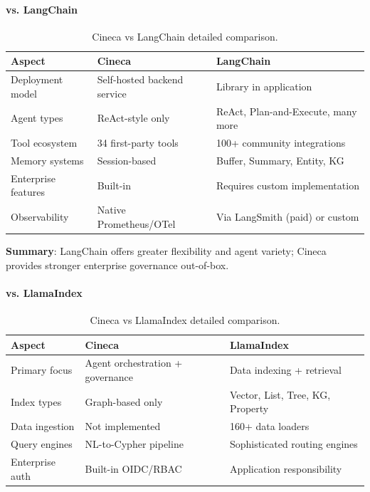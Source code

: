 \paragraph{vs. LangChain}

\begin{table}[ht]
\centering
\caption{Cineca vs LangChain detailed comparison.}
\label{tab:vs-langchain}
\small
\begin{tabular}{lll}
\hline
\textbf{Aspect} & \textbf{Cineca} & \textbf{LangChain} \\
\hline
Deployment model & Self-hosted backend service & Library in application \\
Agent types & ReAct-style only & ReAct, Plan-and-Execute, many more \\
Tool ecosystem & 34 first-party tools & 100+ community integrations \\
Memory systems & Session-based & Buffer, Summary, Entity, KG \\
Enterprise features & Built-in & Requires custom implementation \\
Observability & Native Prometheus/OTel & Via LangSmith (paid) or custom \\
\hline
\end{tabular}
\end{table}

\textbf{Summary}: LangChain offers greater flexibility and agent variety; Cineca provides stronger enterprise governance out-of-box.

\paragraph{vs. LlamaIndex}

\begin{table}[ht]
\centering
\caption{Cineca vs LlamaIndex detailed comparison.}
\label{tab:vs-llamaindex}
\small
\begin{tabular}{lll}
\hline
\textbf{Aspect} & \textbf{Cineca} & \textbf{LlamaIndex} \\
\hline
Primary focus & Agent orchestration + governance & Data indexing + retrieval \\
Index types & Graph-based only & Vector, List, Tree, KG, Property \\
Data ingestion & Not implemented & 160+ data loaders \\
Query engines & NL-to-Cypher pipeline & Sophisticated routing engines \\
Enterprise auth & Built-in OIDC/RBAC & Application responsibility \\
\hline
\end{tabular}
\end{table}

